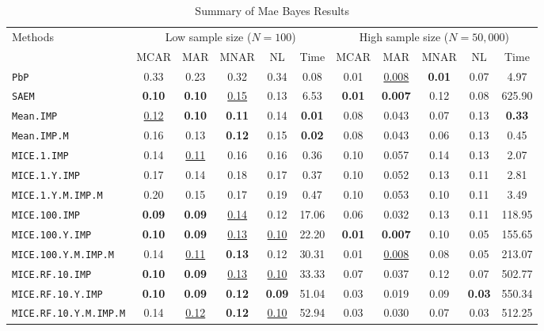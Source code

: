 \begin{table}[h!]
\centering
\begin{tabular}{l cccc c cccc c}
\toprule
\multirow{2}{*}{Methods}
& \multicolumn{5}{c}{Low sample size ($N=100$)} & \multicolumn{5}{c}{High sample size ($N=50,000$)} \\
\cmidrule(lr){2-6} \cmidrule(lr){7-11}
& MCAR & MAR & MNAR & NL & Time & MCAR & MAR & MNAR & NL & Time \\
\midrule
\texttt{PbP} & 0.33 & 0.23 & 0.32 & 0.34 & 0.08 & 0.01 & \underline{0.008} & \textbf{0.01} & 0.07 & 4.97 \\
\texttt{SAEM} & \textbf{0.10} & \textbf{0.10} & \underline{0.15} & 0.13 & 6.53 & \textbf{0.01} & \textbf{0.007} & 0.12 & 0.08 & 625.90 \\
\texttt{Mean.IMP} & \underline{0.12} & \textbf{0.10} & \textbf{0.11} & 0.14 & \textbf{0.01} & 0.08 & 0.043 & 0.07 & 0.13 & \textbf{0.33} \\
\texttt{Mean.IMP.M} & 0.16 & 0.13 & \textbf{0.12} & 0.15 & \textbf{0.02} & 0.08 & 0.043 & 0.06 & 0.13 & 0.45 \\
\texttt{MICE.1.IMP} & 0.14 & \underline{0.11} & 0.16 & 0.16 & 0.36 & 0.10 & 0.057 & 0.14 & 0.13 & 2.07 \\
\texttt{MICE.1.Y.IMP} & 0.17 & 0.14 & 0.18 & 0.17 & 0.37 & 0.10 & 0.052 & 0.13 & 0.11 & 2.81 \\
\texttt{MICE.1.Y.M.IMP.M} & 0.20 & 0.15 & 0.17 & 0.19 & 0.47 & 0.10 & 0.053 & 0.10 & 0.11 & 3.49 \\
\texttt{MICE.100.IMP} & \textbf{0.09} & \textbf{0.09} & \underline{0.14} & 0.12 & 17.06 & 0.06 & 0.032 & 0.13 & 0.11 & 118.95 \\
\texttt{MICE.100.Y.IMP} & \textbf{0.10} & \textbf{0.09} & \underline{0.13} & \underline{0.10} & 22.20 & \textbf{0.01} & \textbf{0.007} & 0.10 & 0.05 & 155.65 \\
\texttt{MICE.100.Y.M.IMP.M} & 0.14 & \underline{0.11} & \textbf{0.13} & 0.12 & 30.31 & 0.01 & \underline{0.008} & 0.08 & 0.05 & 213.07 \\
\texttt{MICE.RF.10.IMP} & \textbf{0.10} & \textbf{0.09} & \underline{0.13} & \underline{0.10} & 33.33 & 0.07 & 0.037 & 0.12 & 0.07 & 502.77 \\
\texttt{MICE.RF.10.Y.IMP} & \textbf{0.10} & \textbf{0.09} & \textbf{0.12} & \textbf{0.09} & 51.04 & 0.03 & 0.019 & 0.09 & \textbf{0.03} & 550.34 \\
\texttt{MICE.RF.10.Y.M.IMP.M} & 0.14 & \underline{0.12} & \textbf{0.12} & \underline{0.10} & 52.94 & 0.03 & 0.030 & 0.07 & 0.03 & 512.25 \\
\bottomrule
\end{tabular}
\caption{Summary of Mae Bayes Results}
\label{tab:mae_bayes_summary}
\end{table}

